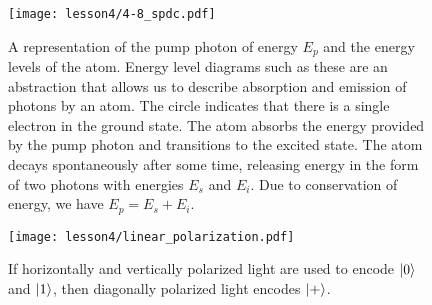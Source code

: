 \begin{figure}[H]
    \centering
    \texttt{[image: lesson4/4-8\_spdc.pdf]}
    
        \caption[pump photon and the energy levels of the atom]{A representation of the pump photon of energy $E_p$ and the energy levels of the atom. Energy level diagrams such as these are an abstraction that allows us to describe absorption and emission of photons by an atom. The circle indicates that there is a single electron in the ground state.
        The atom absorbs the energy provided by the pump photon and transitions to the excited state. The atom decays spontaneously after some time, releasing energy in the form of two photons with energies $E_s$ and $E_i$. Due to conservation of energy, we have $E_p = E_s + E_i$.}
    
    \label{fig:spdc-energy-levels}
\end{figure}


\begin{figure}[H]
    \centering
    \texttt{[image: lesson4/linear\_polarization.pdf]}
    
        \caption[Horizontally, vertically and diagonally polarized light]{If horizontally and vertically polarized light are used to encode $\left| 0 \right\rangle$ and $\left| 1 \right\rangle$, then diagonally polarized light encodes $\left| + \right\rangle$.}
    
    \label{fig:hvd-light}
\end{figure}

